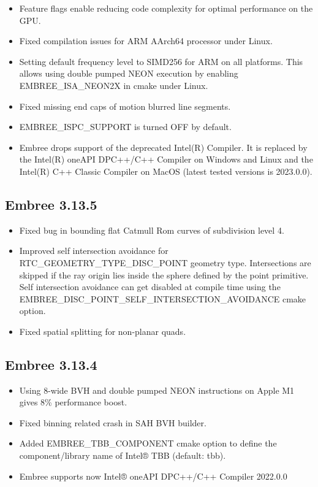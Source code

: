 \begin{itemize}
  through ray query context
\item
  Feature flags enable reducing code complexity for optimal performance
  on the GPU.
\item
  Fixed compilation issues for ARM AArch64 processor under Linux.
\item
  Setting default frequency level to SIMD256 for ARM on all platforms.
  This allows using double pumped NEON execution by enabling
  EMBREE\_ISA\_NEON2X in cmake under Linux.
\item
  Fixed missing end caps of motion blurred line segments.
\item
  EMBREE\_ISPC\_SUPPORT is turned OFF by default.
\item
  Embree drops support of the deprecated Intel(R) Compiler. It is
  replaced by the Intel(R) oneAPI DPC++/C++ Compiler on Windows and
  Linux and the Intel(R) C++ Classic Compiler on MacOS (latest tested
  versions is 2023.0.0).
\end{itemize}

\subsection{Embree 3.13.5}\label{embree-3.13.5}

\begin{itemize}
\tightlist
\item
  Fixed bug in bounding flat Catmull Rom curves of subdivision level 4.
\item
  Improved self intersection avoidance for
  RTC\_GEOMETRY\_TYPE\_DISC\_POINT geometry type. Intersections are
  skipped if the ray origin lies inside the sphere defined by the point
  primitive. Self intersection avoidance can get disabled at compile
  time using the EMBREE\_DISC\_POINT\_SELF\_INTERSECTION\_AVOIDANCE
  cmake option.
\item
  Fixed spatial splitting for non-planar quads.
\end{itemize}

\subsection{Embree 3.13.4}\label{embree-3.13.4}

\begin{itemize}
\tightlist
\item
  Using 8-wide BVH and double pumped NEON instructions on Apple M1 gives
  8\% performance boost.
\item
  Fixed binning related crash in SAH BVH builder.
\item
  Added EMBREE\_TBB\_COMPONENT cmake option to define the
  component/library name of Intel® TBB (default: tbb).
\item
  Embree supports now Intel® oneAPI DPC++/C++ Compiler 2022.0.0
\end{itemize}

